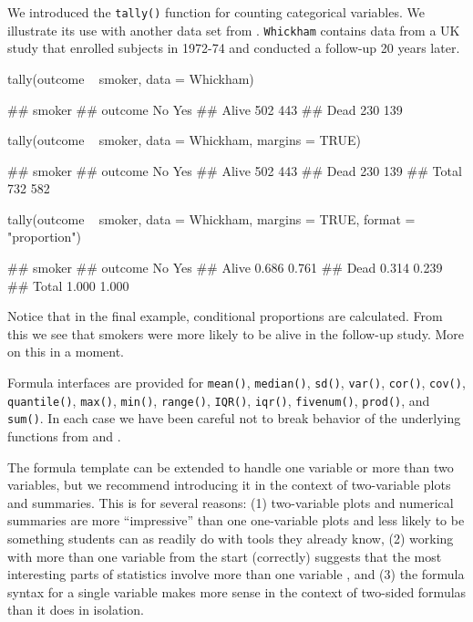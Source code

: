We introduced the \texttt{tally()} function for counting categorical
variables. We illustrate its use with another data set from
 \citep{mosaicData}. \texttt{Whickham} contains data
from a UK study that enrolled subjects in 1972-74 and conducted a
follow-up 20 years later.

\begin{Schunk}
\begin{Sinput}
tally(outcome ~ smoker, data = Whickham)
\end{Sinput}
\begin{Soutput}
##        smoker
## outcome  No Yes
##   Alive 502 443
##   Dead  230 139
\end{Soutput}
\begin{Sinput}
tally(outcome ~ smoker, data = Whickham, margins = TRUE)
\end{Sinput}
\begin{Soutput}
##        smoker
## outcome  No Yes
##   Alive 502 443
##   Dead  230 139
##   Total 732 582
\end{Soutput}
\begin{Sinput}
tally(outcome ~ smoker, data = Whickham, margins = TRUE, format = "proportion")
\end{Sinput}
\begin{Soutput}
##        smoker
## outcome    No   Yes
##   Alive 0.686 0.761
##   Dead  0.314 0.239
##   Total 1.000 1.000
\end{Soutput}
\end{Schunk}

Notice that in the final example, conditional proportions are
calculated. From this we see that smokers were more likely to be alive
in the follow-up study. More on this in a moment.

Formula interfaces are provided for \texttt{mean()}, \texttt{median()},
\texttt{sd()}, \texttt{var()}, \texttt{cor()}, \texttt{cov()},
\texttt{quantile()}, \texttt{max()}, \texttt{min()}, \texttt{range()},
\texttt{IQR()}, \texttt{iqr()}, \texttt{fivenum()}, \texttt{prod()}, and
\texttt{sum()}. In each case we have been careful not to break behavior
of the underlying functions from  and .

The formula template can be extended to handle one variable or more than
two variables, but we recommend introducing it in the context of
two-variable plots and summaries. This is for several reasons: (1)
two-variable plots and numerical summaries are more ``impressive'' than
one one-variable plots and less likely to be something students can as
readily do with tools they already know, (2) working with more than one
variable from the start (correctly) suggests that the most interesting
parts of statistics involve more than one variable
\citep{Wild:RSS:2011}, and (3) the formula syntax for a single variable
makes more sense in the context of two-sided formulas than it does in
isolation.

